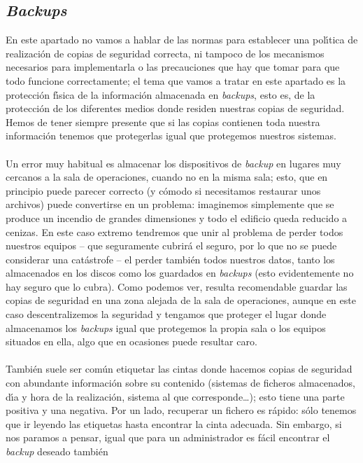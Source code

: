 \subsection{{\it Backups}}
\label{backups}
En este apartado no vamos a hablar de las normas para establecer una 
pol\'{\i}tica de realizaci\'on de copias de seguridad correcta, ni tampoco de
los mecanismos necesarios para implementarla o las precauciones que hay que 
tomar para que todo funcione correctamente; el tema que vamos a tratar en este
apartado es la protecci\'on f\'{\i}sica de la informaci\'on almacenada en {\it 
backups}, esto es, de la protecci\'on de los diferentes medios donde residen
nuestras copias de seguridad. Hemos de tener siempre presente que si las copias 
contienen toda nuestra informaci\'on tenemos que protegerlas igual que 
protegemos nuestros sistemas.\\
\\Un error muy habitual es almacenar los dispositivos de {\it backup} en lugares
muy cercanos a la sala de operaciones, cuando no en la misma sala; esto, que
en principio puede parecer correcto (y c\'omodo si necesitamos restaurar unos
archivos) puede convertirse en un problema: imaginemos simplemente que se
produce un incendio de grandes dimensiones y todo el edificio queda reducido
a cenizas. En este caso extremo tendremos que unir al problema de perder todos
nuestros equipos -- que seguramente cubrir\'a el seguro, por lo que no se puede
considerar una cat\'astrofe -- el perder tambi\'en todos nuestros datos, tanto
los almacenados en los discos como los guardados en {\it backups} (esto
evidentemente no hay seguro que lo cubra). Como podemos ver, resulta 
recomendable guardar las copias de seguridad en una zona alejada de la sala de
operaciones, aunque en este caso descentralizemos la seguridad y tengamos que
proteger el lugar donde almacenamos los {\it backups} igual que protegemos la
propia sala o los equipos situados en ella, algo que en ocasiones puede
resultar caro.\\
\\Tambi\'en suele ser com\'un etiquetar las cintas donde hacemos copias de 
seguridad con abundante informaci\'on sobre su contenido (sistemas de ficheros
almacenados, d\'{\i}a y hora de la realizaci\'on, sistema al que 
corresponde\ldots); esto tiene una parte positiva y una negativa. Por un lado,
recuperar un fichero es r\'apido: s\'olo tenemos que ir leyendo las etiquetas
hasta encontrar la cinta adecuada. Sin embargo, si nos paramos a pensar, igual
que para un administrador es f\'acil encontrar el {\it backup} deseado tambi\'en
